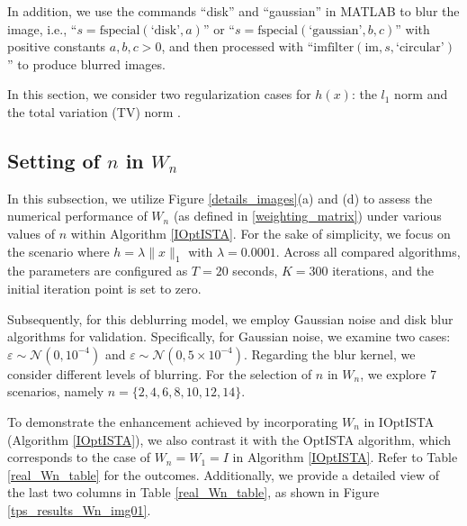 \documentclass{article}
\begin{document}
In addition, we use the commands ``disk'' and ``gaussian'' in MATLAB to blur the image, i.e., ``$s = \text{fspecial}(\text{`disk'}, a)$'' or ``$s = \text{fspecial}(\text{`gaussian'}, b, c)$'' with positive constants $a, b, c > 0$, and then processed with ``$\text{imfilter}(\text{im}, s, \text{`circular'})$'' to produce blurred images.

In this section, we consider two regularization cases for $h(x)$: the $l_1$ norm \cite{Tibshirani96} and the total variation (TV) norm \cite{RudinOF92}.
\subsection{Setting of \texorpdfstring{$n$}{n} in \texorpdfstring{$W_{n}$}{Wn}}

In this subsection, we utilize Figure \ref{details_images}(a) and (d) to assess the numerical performance of $W_n$ (as defined in \eqref{weighting_matrix}) under various values of $n$ within Algorithm \ref{IOptISTA}. For the sake of simplicity, we focus on the scenario where $h = \lambda \|x\|_1$ with $\lambda = 0.0001$. Across all compared algorithms, the parameters are configured as $T = 20$ seconds, $K = 300$ iterations, and the initial iteration point is set to zero. 

Subsequently, for this deblurring model, we employ Gaussian noise and disk blur algorithms for validation. Specifically, for Gaussian noise, we examine two cases: $\varepsilon \sim \mathcal{N}(0, 10^{-4})$ and $\varepsilon \sim \mathcal{N}(0, 5 \times 10^{-4})$. Regarding the blur kernel, we consider different levels of blurring. For the selection of $n$ in $W_n$, we explore 7 scenarios, namely $n = \{2, 4, 6, 8, 10, 12, 14\}$. 

To demonstrate the enhancement achieved by incorporating $W_n$ in IOptISTA (Algorithm \ref{IOptISTA}), we also contrast it with the OptISTA algorithm, which corresponds to the case of $W_n = W_1 = I$ in Algorithm \ref{IOptISTA}. Refer to Table \ref{real_Wn_table} for the outcomes. Additionally, we provide a detailed view of the last two columns in Table \ref{real_Wn_table}, as shown in Figure \ref{tps_results_Wn_img01}.
\end{document}
